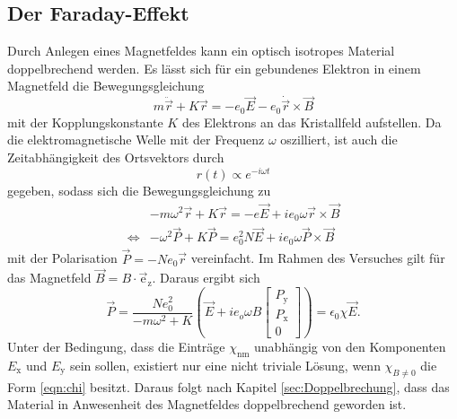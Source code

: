 \subsection{Der Faraday-Effekt}
Durch Anlegen eines Magnetfeldes kann ein optisch isotropes Material doppelbrechend werden. Es lässt sich für ein gebundenes Elektron in einem 
Magnetfeld die Bewegungsgleichung
\begin{equation*}
    m\ddot{\vec{r}}+K\vec{r}=-e_0\vec{E}-e_0\dot{\vec{r}}\times\vec{B}
\end{equation*}
mit der Kopplungskonstante $K$ des Elektrons an das Kristallfeld aufstellen. 
Da die elektromagnetische Welle mit der Frequenz $\omega$ oszilliert, ist auch die Zeitabhängigkeit des Ortsvektors durch 
\begin{equation*}
    r(t)\propto e^{-i\omega t}
\end{equation*}
gegeben, sodass sich die Bewegungsgleichung zu 
\begin{align*}
    &-m\omega^2\vec{r}+K\vec{r}=-e\vec{E}+ie_0\omega\vec{r}\times\vec{B}\\
    \Leftrightarrow &-\omega^2\vec{P}+K\vec{P}=e_0^2N\vec{E}+ie_0\omega\vec{P}\times\vec{B}
\end{align*}
mit der Polarisation $\vec{P}= -Ne_0\vec{r}$ vereinfacht. Im Rahmen des Versuches gilt für das Magnetfeld $\vec{B}=B\cdot\vec{\text{e}}_\text{z}$. 
Daraus ergibt sich
\begin{equation*}
    \vec{P}=\frac{Ne_0^2}{-m\omega^2+K}\left(\vec{E}+ie_o\omega B
    \left[
    \begin{array}{c}
        P_\text{y}\\
        P_\text{x}\\
        0
    \end{array}
    \right]\right)
    =\epsilon_0\chi\vec{E} .
\end{equation*}
Unter der Bedingung, dass die Einträge $\chi_\text{nm}$ unabhängig von den Komponenten $E_\text{x}$ und $E_\text{y}$ sein sollen, existiert nur eine 
nicht triviale Lösung, wenn $\chi_{B\neq 0}$ die Form \ref{eqn:chi} besitzt. Daraus folgt nach Kapitel \ref{sec:Doppelbrechung}, dass das Material in 
Anwesenheit des Magnetfeldes doppelbrechend geworden ist.

